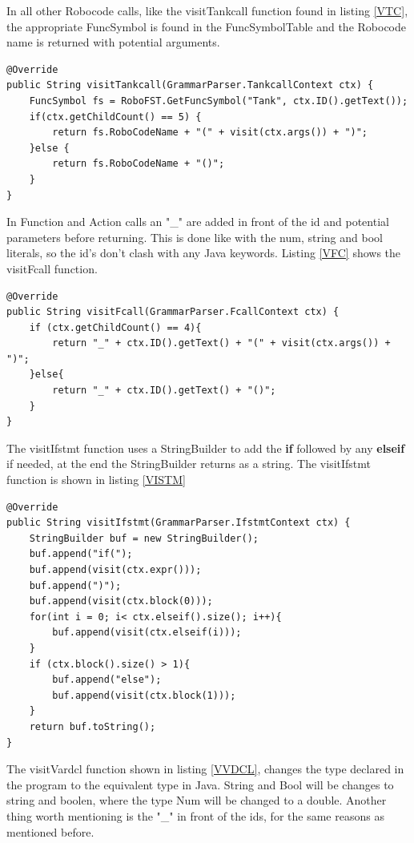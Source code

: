 In all other Robocode calls, like the visitTankcall function found in listing \ref{VTC}, the appropriate FuncSymbol is found in the FuncSymbolTable and the Robocode name is returned with potential arguments.

\begin{lstlisting}[caption={CodeGen - visitTankcall function}, label={VTC}]
@Override
public String visitTankcall(GrammarParser.TankcallContext ctx) {
    FuncSymbol fs = RoboFST.GetFuncSymbol("Tank", ctx.ID().getText());
    if(ctx.getChildCount() == 5) {
        return fs.RoboCodeName + "(" + visit(ctx.args()) + ")";
    }else {
        return fs.RoboCodeName + "()";
    }
}
\end{lstlisting}

In Function and Action calls an "\_" are added in front of the id and potential parameters before returning. This is done like with the num, string and bool literals, so the id's don't clash with any Java keywords. Listing \ref{VFC} shows the visitFcall function.

\begin{lstlisting}[caption={CodeGen - visitFcall function}, label={VFC}]
@Override
public String visitFcall(GrammarParser.FcallContext ctx) {
    if (ctx.getChildCount() == 4){
        return "_" + ctx.ID().getText() + "(" + visit(ctx.args()) + ")";
    }else{
        return "_" + ctx.ID().getText() + "()";
    }
}
\end{lstlisting}

The visitIfstmt function uses a StringBuilder to add the \textbf{if} followed by any \textbf{elseif} if needed, at the end the StringBuilder returns as a string. The visitIfstmt function is shown in listing \ref{VISTM}

\begin{lstlisting}[caption={CodeGen - visitIfstmt function}, label={VISTM}]
@Override
public String visitIfstmt(GrammarParser.IfstmtContext ctx) {
    StringBuilder buf = new StringBuilder();
    buf.append("if(");
    buf.append(visit(ctx.expr()));
    buf.append(")");
    buf.append(visit(ctx.block(0)));
    for(int i = 0; i< ctx.elseif().size(); i++){
        buf.append(visit(ctx.elseif(i)));
    }
    if (ctx.block().size() > 1){
        buf.append("else");
        buf.append(visit(ctx.block(1)));
    }
    return buf.toString();
}
\end{lstlisting}

The visitVardcl function shown in listing \ref{VVDCL}, changes the type declared in the program to the equivalent type in Java. String and Bool will be changes to string and boolen, where the type Num will be changed to a double. Another thing worth mentioning is the "\_" in front of the ids, for the same reasons as mentioned before.

